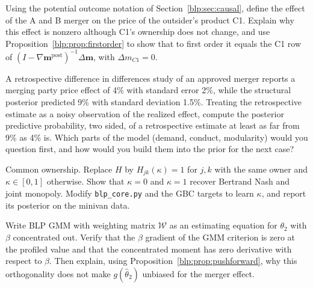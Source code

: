 \begin{exercises}
\item\label{ex:chapter_blp:7}\label{blp:ex:interference} Using the potential outcome notation of
Section~\ref{blp:sec:causal}, define the effect of the A and B merger on the price of the
outsider's product C1. Explain why this effect is nonzero although C1's ownership does not change,
and use Proposition~\ref{blp:prop:firstorder} to show that to first order it equals the C1 row of
$(I-\nabla\bm m^{\mathrm{post}})^{-1}\Delta\bm m$, with $\Delta m_{C1} = 0$.

\item\label{ex:chapter_blp:8}\label{blp:ex:retro} A retrospective difference in differences study of an approved merger
reports a merging party price effect of 4\% with standard error 2\%, while the structural
posterior predicted 9\% with standard deviation 1.5\%. Treating the retrospective estimate as a
noisy observation of the realized effect, compute the posterior predictive probability, two sided, of a retrospective estimate at least as far from 9\% as 4\% is. Which parts of the model (demand, conduct, modularity) would you question
first, and how would you build them into the prior for the next case?

\item\label{ex:chapter_blp:9}\label{blp:ex:kappa} Common ownership. Replace $H$ by $H_{jk}(\kappa) = 1$ for $j,k$ with the
same owner and $\kappa\in[0,1]$ otherwise. Show that $\kappa = 0$ and $\kappa = 1$ recover
Bertrand Nash and joint monopoly. Modify \texttt{blp\_core.py} and the GBC targets to learn
$\kappa$, and report its posterior on the minivan data.

\item\label{ex:chapter_blp:10}\label{blp:ex:dml} Write BLP GMM with weighting matrix $\mathcal W$ as an estimating equation for $\theta_2$ with $\beta$ concentrated out. Verify that the $\beta$ gradient of the GMM criterion is zero at the profiled value and that the concentrated moment has zero derivative with respect to $\beta$. Then explain, using Proposition~\ref{blp:prop:pushforward}, why this orthogonality does not make $g(\hat\theta_2)$ unbiased for the merger effect.
\end{exercises}
